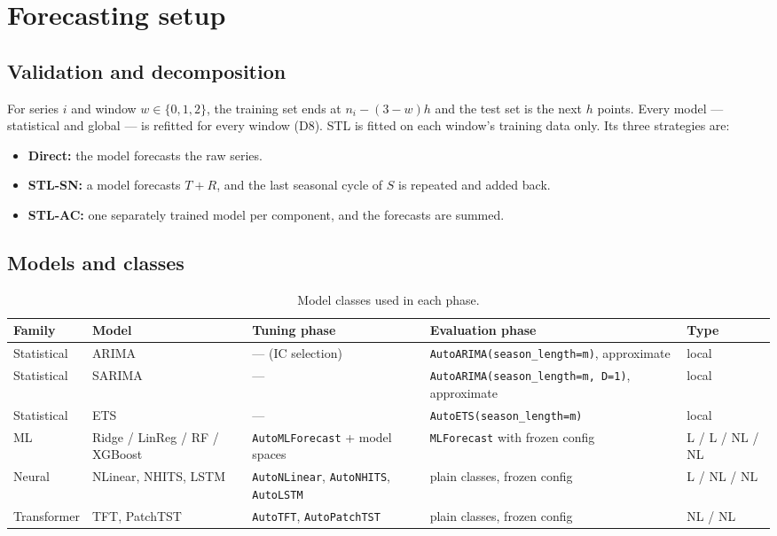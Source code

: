 \documentclass[11pt,a4paper]{article}
\newcommand{\code}[1]{\texttt{#1}}
\begin{document}
\section{Forecasting setup}\label{sec:forecasting}

\subsection{Validation and decomposition}

For series $i$ and window $w \in \{0,1,2\}$, the training set ends at $n_i - (3-w)h$ and the test
set is the next $h$ points. Every model --- statistical and global --- is refitted for every
window (D8). STL is fitted on each window's training data only. Its three strategies are:
\begin{itemize}
  \item \textbf{Direct:} the model forecasts the raw series.
  \item \textbf{STL-SN:} a model forecasts $T+R$, and the last seasonal cycle of $S$ is repeated and
  added back.
  \item \textbf{STL-AC:} one separately trained model per component, and the forecasts are summed.
\end{itemize}

\subsection{Models and classes}

\begin{table}[h]
\centering\small
\caption{Model classes used in each phase.}\label{tab:models}
\begin{tabularx}{\linewidth}{@{}l l l X l@{}}
\toprule
Family & Model & Tuning phase & Evaluation phase & Type \\
\midrule
Statistical & ARIMA & --- (IC selection) & \code{AutoARIMA(season_length=m)}, approximate & local \\
Statistical & SARIMA & --- & \code{AutoARIMA(season_length=m, D=1)}, approximate & local \\
Statistical & ETS & --- & \code{AutoETS(season_length=m)} & local \\
ML & Ridge / LinReg / RF / XGBoost & \code{AutoMLForecast} + model spaces & \code{MLForecast} with frozen config & L / L / NL / NL \\
Neural & NLinear, NHITS, LSTM & \code{AutoNLinear}, \code{AutoNHITS}, \code{AutoLSTM} & plain classes, frozen config & L / NL / NL \\
Transformer & TFT, PatchTST & \code{AutoTFT}, \code{AutoPatchTST} & plain classes, frozen config & NL / NL \\
\bottomrule
\end{tabularx}
\end{table}
\end{document}
